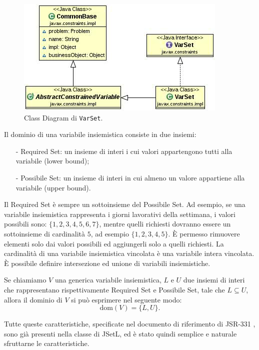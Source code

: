 \begin{figure}[!ht]\label{varsetUML}
\centering
\includegraphics[scale=.75]{img/VarSet.JPG}
\caption{Class Diagram di \texttt{VarSet}.}
\end{figure}

\begin{flushleft}
Il dominio di una variabile insiemistica consiste in due insiemi:
\begin{enumerate}
\item[-]Required Set: un insieme di interi i cui valori appartengono
 tutti alla variabile (lower bound);
\item[-]Possibile Set: un insieme di interi in cui almeno un valore
appartiene alla variabile (upper bound).
\end{enumerate}
\end{flushleft}
Il Required Set è sempre un sottoinsieme del Possibile Set. Ad esempio,
se una variabile insiemistica rappresenta i giorni lavorativi della settimana, 
i valori possibili sono: $\{1, 2, 3, 4, 5, 6, 7 \}$, mentre quelli richiesti
dovranno essere un sottoinsieme di cardinalità $5$, ad esempio 
$\{1, 2, 3, 4, 5\}$. 
\`E permesso rimuovere elementi solo dai valori possibili ed
aggiungerli solo a quelli richiesti. La cardinalità di una variabile
insiemistica vincolata è una variabile intera vincolata. \`E possibile definire
intersezione ed unione di variabili insiemistiche.


Se chiamiamo $V$ una generica variabile insiemistica, $L$ e $U$ due insiemi di
interi che rappresentano rispettivamente Required Set e Possibile Set,
tale che $L \subseteq U$, allora il dominio di $V$ si può esprimere nel
seguente modo:
\[
\textrm{dom}(V) = \{L,U\}.
\]
\begin{flushleft}
Tutte queste caratteristiche, specificate nel documento di riferimento di
JSR-331 \cite{specifiche}, sono già presenti nella classe  di 
JSetL, ed è
stato quindi semplice e naturale sfruttarne le caratteristiche.
\end{flushleft}
